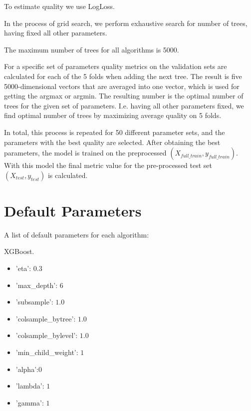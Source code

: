 \documentclass{article}
\begin{document}
To estimate quality we use LogLoss.
 

In the process of grid search, we perform exhaustive search for number of trees, having fixed all other parameters.

The maximum number of trees for all algorithms is 5000.

For a specific set of parameters quality metrics on the validation sets are calculated for each of the 5 folds when adding the next tree. The result is five 5000-dimensional vectors that are averaged into one vector, which is used for getting the argmax or argmin. The resulting number is the optimal number of trees for the given set of parameters. I.e. having all other parameters fixed, we find optimal number of trees by maximizing average quality on 5 folds.

In total, this process is repeated for 50 different parameter sets, and the parameters with the best quality are selected. After obtaining the best parameters, the model is trained on the preprocessed $(X_{full\_train}, y_{full\_train})$. With this model the final metric value for the pre-processed test set $(X_{test}, y_{test})$ is calculated.

\section{Default Parameters}
A list of default parameters for each algorithm:

\medskip
\noindent XGBoost.
\begin{itemize}
  \item 'eta': $0.3$
  \item 'max\_depth': $6$
  \item 'subsample': $1.0$
  \item 'colsample\_bytree': $1.0$
  \item 'colsample\_bylevel': $1.0$
  \item 'min\_child\_weight': $1$
  \item 'alpha':$0$
  \item 'lambda': $1$
  \item 'gamma': $1$
\end{itemize}
\end{document}

